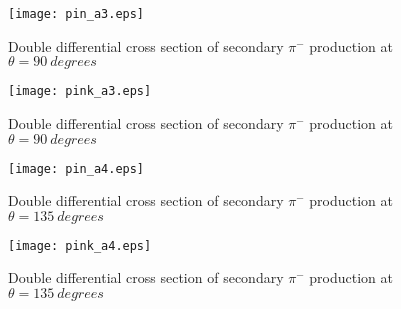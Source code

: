\documentclass[12pt]{article}
\begin{document}
\begin{figure}[htbp]
\caption{Double differential cross section of secondary $\pi^-$ production at $\theta = 90~degrees$}
\label{figpin3} 
\centerline{\texttt{[image: pin\_a3.eps]}}
\end{figure}

\begin{figure}[htbp]
\caption{Double differential cross section of secondary $\pi^-$ production at $\theta = 90~degrees$}
\label{figpink3} 
\centerline{\texttt{[image: pink\_a3.eps]}}
\end{figure}

\begin{figure}[htbp]
\caption{Double differential cross section of secondary $\pi^-$ production at $\theta = 135~degrees$}
\label{figpin4} 
\centerline{\texttt{[image: pin\_a4.eps]}}
\end{figure}

\begin{figure}[htbp]
\caption{Double differential cross section of secondary $\pi^-$ production at $\theta = 135~degrees$}
\label{figpink4} 
\centerline{\texttt{[image: pink\_a4.eps]}}
\end{figure}
\end{document}
